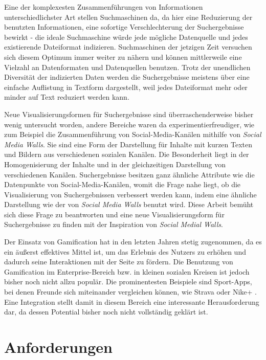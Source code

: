 \documentclass[12pt,twoside]{book}
\begin{document}
Eine der komplexesten Zusammenführungen von Informationen unterschiedlichster Art stellen Suchmaschinen da, da hier eine Reduzierung der benutzten Informationen, eine sofortige Verschlechterung der Suchergebnisse bewirkt - die ideale Suchmaschine würde jede mögliche Datenquelle und jedes existierende Dateiformat indizieren.
Suchmaschinen der jetzigen Zeit versuchen sich diesem Optimum immer weiter zu nähern und können mittlerweile eine Vielzahl an Datenformaten und Datenquellen benutzen.
Trotz der unendlichen Diversität der indizierten Daten werden die Suchergebnisse meistens über eine einfache Auflistung in Textform dargestellt, weil jedes Dateiformat mehr oder minder auf Text reduziert werden kann.

Neue Visualisierungsformen für Suchergebnisse sind überraschenderweise bisher wenig untersucht worden, andere Bereiche waren da experimentierfreudiger, wie zum Beispiel die Zusammenführung von Social-Media-Kanälen mithilfe von \textit{Social Media Walls}.
Sie sind eine Form der Darstellung für Inhalte mit kurzen Texten und Bildern aus verschiedenen sozialen Kanälen. Die Besonderheit liegt in der Homogenisierung der Inhalte und in der gleichzeitigen Darstellung von verschiedenen Kanälen.
Suchergebnisse besitzen ganz ähnliche Attribute wie die Datenpunkte von Social-Media-Kanälen, womit die Frage nahe liegt, ob die Visualisierung von Suchergebnissen verbessert werden kann, indem eine ähnliche Darstellung wie der von \textit{Social Media Walls} benutzt wird.
Diese Arbeit bemüht sich diese Frage zu beantworten und eine neue Visualisierungsform für Suchergebnisse zu finden mit der Inspiration von \textit{Social Medial Walls}.

Der Einsatz von Gamification hat in den letzten Jahren stetig zugenommen, da es ein äußerst effektives Mittel ist, um das Erlebnis des Nutzers zu erhöhen und dadurch seine Interaktionen mit der Seite zu fördern.
Die Benutzung von Gamification im Enterprise-Bereich bzw. in kleinen sozialen Kreisen ist jedoch bisher noch nicht allzu populär. Die prominentesten Beispiele sind Sport-Apps, bei denen Freunde sich miteinander vergleichen können, wie Strava \cite{strava} oder Nike+ \cite{nike}. Eine Integration stellt damit in diesem Bereich eine interessante Herausforderung dar, da dessen Potential bisher noch nicht vollständig geklärt ist.


\section{Anforderungen}
\end{document}
